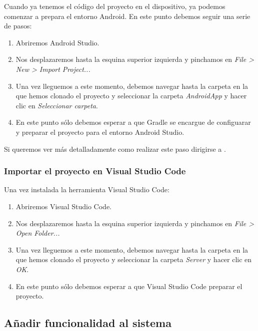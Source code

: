Cuando ya tenemos el código del proyecto en el dispositivo, ya podemos comenzar a prepara el entorno Android. En este punto debemos seguir una serie de pasos:
\begin{enumerate}
\item
	Abriremos Android Studio.
\item
	Nos desplazaremos hasta la esquina superior izquierda y pinchamos en \textit{File > New > Import Project...}
\item
	Una vez lleguemos a este momento, debemos navegar hasta la carpeta en la que hemos clonado el proyecto y seleccionar la carpeta \textit{AndroidApp} y hacer clic en \textit{Seleccionar carpeta}.
\item
	En este punto sólo debemos esperar a que Gradle se encargue de configuarar y preparar el proyecto para el entorno Android Studio.
\end{enumerate}

Si queremos ver más detalladamente como realizar este paso dirigirse a \cite{importAS}.

\subsubsection{Importar el proyecto en Visual Studio Code}\label{importtovsc}

Una vez instalada la herramienta Visual Studio Code:

\begin{enumerate}
\item
	Abriremos Visual Studio Code.
\item
	Nos desplazaremos hasta la esquina superior izquierda y pinchamos en \textit{File > Open Folder...}
\item
	Una vez lleguemos a este momento, debemos navegar hasta la carpeta en la que hemos clonado el proyecto y seleccionar la carpeta \textit{Server} y hacer clic en \textit{OK}.
\item
	En este punto sólo debemos esperar a que Visual Studio Code preparar el proyecto.
\end{enumerate}

\subsection{Añadir funcionalidad al sistema}

